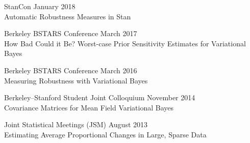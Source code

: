 StanCon \hfill January 2018\\
Automatic Robustness Measures in Stan


Berkeley BSTARS Conference \hfill March 2017\\
How Bad Could it Be?  Worst-case Prior Sensitivity Estimates for Variational Bayes


Berkeley BSTARS Conference \hfill March 2016\\
Measuring Robustness with Variational Bayes

Berkeley--Stanford Student Joint Colloquium \hfill November 2014\\
Covariance Matrices for Mean Field Variational Bayes

Joint Statistical Meetings (JSM) \hfill August 2013\\
Estimating Average Proportional Changes in Large, Sparse Data
